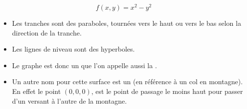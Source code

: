 \documentclass[11pt,class=report,crop=false]{standalone}
\begin{document}
\begin{exemple}
$$f(x,y) = x^2-y^2$$


\begin{itemize}
  \item Les tranches sont des paraboles, tournées vers le haut ou vers le bas selon la direction de la tranche.
  \item Les lignes de niveau sont des hyperboles.
  \item Le graphe est donc un  que l'on appelle aussi la .
  \item Un autre nom pour cette surface est un  (en référence à un col en montagne). 
  En effet le point $(0,0,0)$, est le point de passage le moins haut pour passer d'un versant à l'autre de la montagne. 
\end{itemize}


\end{exemple}
\end{document}
